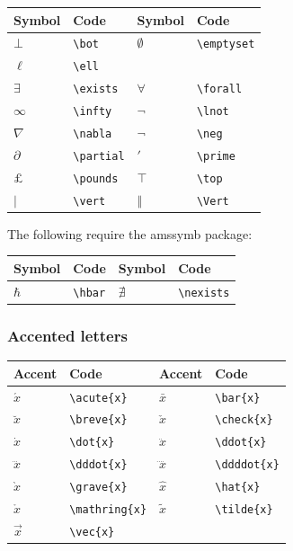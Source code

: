 \documentclass[a4paper,14pt]{extarticle}
\begin{document}
\begin{center}
\begin{tabular}{|p{}p{}|p{}p{}|}
\hline
Symbol & Code & Symbol & Code \\
\hline
\(\bot\) & \verb=\bot= & \(\emptyset\) & \verb=\emptyset= \\
\(\ell\) & \verb=\ell= & & \\
\(\exists\) & \verb=\exists= & \(\forall\) & \verb=\forall= \\
\(\infty\) & \verb=\infty= & \(\lnot\) & \verb=\lnot= \\
\(\nabla\) & \verb=\nabla= & \(\neg\) & \verb=\neg= \\
\(\partial\) & \verb=\partial= & \(\prime\) & \verb=\prime= \\
\(\pounds\) & \verb=\pounds= & \(\top\) & \verb=\top= \\ 
\(\vert\) & \verb=\vert= & \(\Vert\) & \verb=\Vert= \\
\hline
\end{tabular}
\end{center}

The following require the amssymb package:
\begin{center}
\begin{tabular}{|p{}p{}|p{}p{}|}
\hline
Symbol & Code & Symbol & Code \\
\hline
\(\hbar\) & \verb=\hbar= & \(\nexists\) & \verb=\nexists= \\
\hline
\end{tabular}
\end{center}

\subsubsection{Accented letters}

\begin{center}
\begin{tabular}{|p{}p{}|p{}p{}|}
\hline
Accent & Code & Accent & Code \\
\hline
\(\acute{x}\) & \verb=\acute{x}= & \(\bar{x}\) & \verb=\bar{x}= \\
\(\breve{x}\) & \verb=\breve{x}= & \(\check{x}\) & \verb=\check{x}= \\
\(\dot{x}\) & \verb=\dot{x}= & \(\ddot{x}\) & \verb=\ddot{x}= \\
\(\dddot{x}\) & \verb=\dddot{x}= & \(\ddddot{x}\) & \verb=\ddddot{x}= \\
\(\grave{x}\) & \verb=\grave{x}= & \(\hat{x}\) & \verb=\hat{x}= \\
\(\mathring{x}\) & \verb=\mathring{x}= & \(\tilde{x}\) & \verb=\tilde{x}= \\
\(\vec{x}\) & \verb=\vec{x}= & &\\
\hline
\end{tabular}
\end{center}
\end{document}
